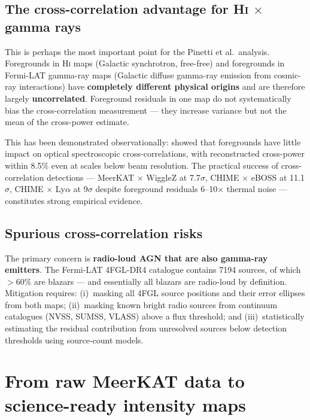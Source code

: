 \documentclass[10pt,a4paper]{article}
\begin{document}
\subsection{The cross-correlation advantage for
\texorpdfstring{H\textsc{i} $\times$ gamma rays}{HI x gamma rays}}

This is perhaps the most important point for the Pinetti et al.\ analysis.
Foregrounds in H\textsc{i} maps (Galactic synchrotron, free-free) and
foregrounds in Fermi-LAT gamma-ray maps (Galactic diffuse gamma-ray emission
from cosmic-ray interactions) have \textbf{completely different physical
origins} and are therefore largely \textbf{uncorrelated}.  Foreground residuals
in one map do not systematically bias the cross-correlation measurement ---
they increase variance but not the mean of the cross-power estimate.

This has been demonstrated observationally: \citet{Cunnington2019} showed that
foregrounds have little impact on optical spectroscopic cross-correlations, with
reconstructed cross-power within 8.5\% even at scales below beam resolution.
The practical success of cross-correlation detections --- MeerKAT $\times$
WiggleZ at 7.7$\sigma$, CHIME $\times$ eBOSS at 11.1$\sigma$, CHIME $\times$
Ly$\alpha$ at 9$\sigma$ despite foreground residuals 6--10$\times$ thermal
noise --- constitutes strong empirical evidence.


\subsection{Spurious cross-correlation risks}

The primary concern is \textbf{radio-loud AGN that are also gamma-ray
emitters}.  The Fermi-LAT 4FGL-DR4 catalogue contains 7194 sources, of which
$>60\%$ are blazars --- and essentially all blazars are radio-loud by
definition.  Mitigation requires: (i)~masking all 4FGL source positions and
their error ellipses from both maps; (ii)~masking known bright radio sources
from continuum catalogues (NVSS, SUMSS, VLASS) above a flux threshold; and
(iii)~statistically estimating the residual contribution from unresolved
sources below detection thresholds using source-count models.


\section{From raw MeerKAT data to science-ready intensity maps}
\label{sec:pipeline}
\end{document}
